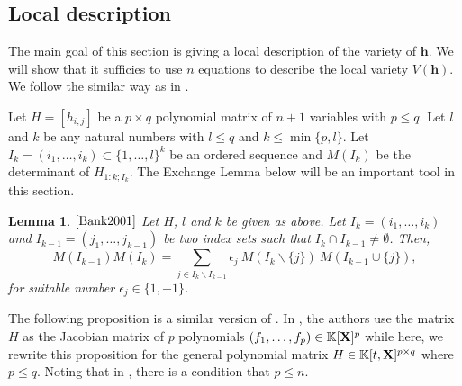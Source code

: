 \documentclass[11pt]{article}
\numberwithin{Property}{section}
\numberwithin{Theorem}{section}
\numberwithin{Proposition}{section}
\newtheorem{Lemma}{Lemma}%
\numberwithin{Lemma}{section}
\numberwithin{Corollary}{section}
\numberwithin{Definition}{section}
\numberwithin{Remark}{section}
\numberwithin{Conjecture}{section}
\numberwithin{Problem}{section}
\numberwithin{Claim}{section}
\theoremstyle{definition}
\numberwithin{Example}{section}
\def\h {\ensuremath{\mathbf{h}}}
\renewcommand{\leq}{\leqslant}
\newcommand{\field}{\mathbb{K}} %
\newcommand{\mat}[1]{\mathbf{\MakeUppercase{#1}}} %
\begin{document}
\subsection{Local description}
\label{subsec:local}
The main goal of this section is giving a local description of the variety of $\h$. We will show that it sufficies to use $n$ equations to describe the local variety $V(\h)$. We follow the similar way as in \cite[Section ~ 2.2]{Bank2001}. 

Let $H = [h_{i,j}]$ be a $p \times q$ polynomial matrix of $n+1$ variables with $p \leq q$. Let $l$ and $k$ be any natural numbers with $l \leq q$ and $k \leq \min\{p,l\}$. Let $I_k = (i_1, \ldots, i_k) \subset \{1, \ldots, l\}^k$ be an ordered sequence and $M(I_k)$ be the determinant of $H_{1:k;I_k}$. The Exchange Lemma below will be an important tool in this section. 
\begin{Lemma}$\cite{Bank2001}$ Let $H$, $l$ and $k$ be given as above. Let $I_k = (i_1, \ldots, i_k)$ amd $I_{k-1} = (j_1, \ldots, j_{k-1})$ be two index sets such that $I_k \cap I_{k-1} \ne \emptyset$. Then, 
\[
M({I_{k-1}})M(I_k) = \sum_{j \in I_k \backslash I_{k-1}} \epsilon_j \ M(I_k \backslash \{j\}) \ M(I_{k-1} \cup \{j\}), 
\] for suitable number $\epsilon_j \in \{1, -1\}$. \label{exchange}
\end{Lemma}
The following proposition is a similar version of \cite[Proposition ~ 5]{Bank2001}. In \cite{Bank2001}, the authors use the matrix $H$ as the Jacobian matrix of $p$ polynomials $(f_1, \ldots, f_p) \in \field[\mat{X}]^p$ while here, we rewrite this proposition for the general polynomial matrix $H \in \field[t,\mat{X}]^{p \times q}$ where $p \leq q$. Noting that in \cite{Bank2001}, there is a condition that $p \leq n$. 
\end{document}
